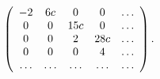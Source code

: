 \begin{equation}
\label{eq:pure.scalar.matrix}
\left(
\begin{array}{c c c c c}
-2&
6c&
0&0&\ldots\\
0&0&
15c&
0&\ldots\\
0&0&2&
28c&
\ldots\\
0&0&0&4&\ldots\cr
\ldots&\ldots&\ldots&\ldots&\ldots
\end{array}
\right).
\end{equation}

